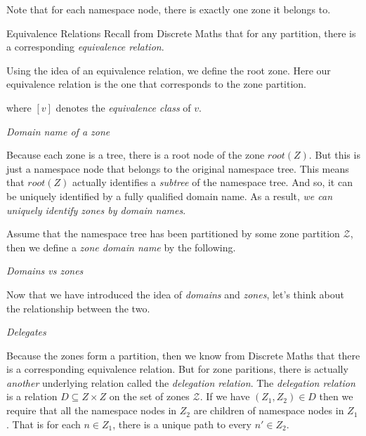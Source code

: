 Note that for each namespace node, there is exactly 
one zone it belongs to. 

\begin{sidenote}{Equivalence Relations} 
Recall from Discrete Maths that for any partition, 
there is a corresponding \textit{equivalence relation}.
\end{sidenote}

Using the idea of an equivalence relation, we define the root zone.
Here our equivalence relation is the one that corresponds to the 
zone partition.

where $[v]$ denotes the \textit{equivalence class} of $v$. 



\frmrule 

\textit{Domain name of a zone}

Because each zone is a tree, there is a root node of the zone $root(Z)$. 
But this is just a namespace node that belongs to the 
original namespace tree. This means that $root(Z)$ actually 
identifies a \textit{subtree} of the namespace tree.
And so, it can be uniquely 
identified by a fully qualified domain name. As a result, 
\textit{we can uniquely identify zones by domain names}. 

Assume that the namespace tree has been partitioned by some zone partition $\mathcal{Z}$, then
we define a \textit{zone domain name} by the following.

\frmrule 

\begin{example}
\end{example}

\frmrule

\textit{Domains vs zones}

Now that we have introduced the idea of \textit{domains} and \textit{zones}, 
let's think about the relationship between the two.


\frmrule

\textit{Delegates}

Because the zones form a partition, then we know from Discrete Maths that 
there is a corresponding equivalence relation. 
But for zone paritions, there is actually \textit{another} underlying relation 
called the \textit{delegation relation}.
The \textit{delegation relation} is a relation $D \subseteq Z \times Z$ 
on the set of zones $\mathcal{Z}$. 
If we have $(Z_1,Z_2) \in D$ then we require that
all the namespace nodes in $Z_2$ are children of namespace nodes in $Z_1$. 
That is for each $n \in Z_1$, there is a unique path to every $n' \in Z_2$. 

